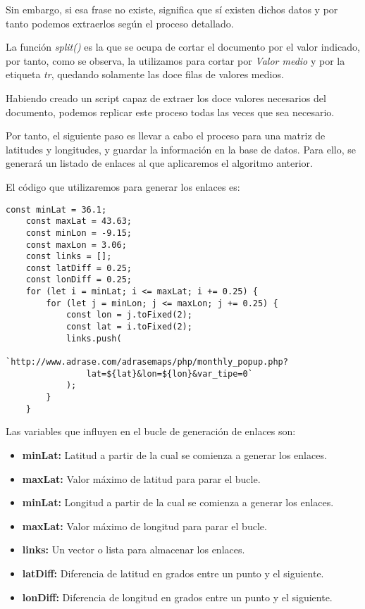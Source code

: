 Sin embargo, si esa frase no existe, significa que sí existen dichos datos y por tanto podemos extraerlos según el proceso detallado.

La función \textit{split()} es la que se ocupa de cortar el documento por el valor indicado, por tanto, como se observa, la utilizamos para cortar por \textit{Valor medio} y por la etiqueta \textit{tr}, quedando solamente las doce filas de valores medios.

Habiendo creado un script capaz de extraer los doce valores necesarios del documento, podemos replicar este proceso todas las veces que sea necesario.

Por tanto, el siguiente paso es llevar a cabo el proceso para una matriz de latitudes y longitudes, y guardar la información en la base de datos. Para ello, se generará un listado de enlaces al que aplicaremos el algoritmo anterior.

El código que utilizaremos para generar los enlaces es:

\begin{lstlisting}[style=ES6, caption={Proceso de generación de enlaces \label{code:generate_links}}]
	const minLat = 36.1;
	const maxLat = 43.63;
	const minLon = -9.15;
	const maxLon = 3.06;
	const links = [];
	const latDiff = 0.25;
	const lonDiff = 0.25;
	for (let i = minLat; i <= maxLat; i += 0.25) {
		for (let j = minLon; j <= maxLon; j += 0.25) {
			const lon = j.toFixed(2);
			const lat = i.toFixed(2);
			links.push(
				`http://www.adrase.com/adrasemaps/php/monthly_popup.php?
				lat=${lat}&lon=${lon}&var_tipe=0`
			);
		}	
	}	
\end{lstlisting}

Las variables que influyen en el bucle de generación de enlaces son:

\begin{itemize}
\item \textbf{minLat:} Latitud a partir de la cual se comienza a generar los enlaces.
\item \textbf{maxLat:} Valor máximo de latitud para parar el bucle.
\item \textbf{minLat:} Longitud a partir de la cual se comienza a generar los enlaces.
\item \textbf{maxLat:} Valor máximo de longitud para parar el bucle.
\item \textbf{links:} Un vector o lista para almacenar los enlaces.
\item \textbf{latDiff:} Diferencia de latitud en grados entre un punto y el siguiente.
\item \textbf{lonDiff:} Diferencia de longitud en grados entre un punto y el siguiente.
\end{itemize}

